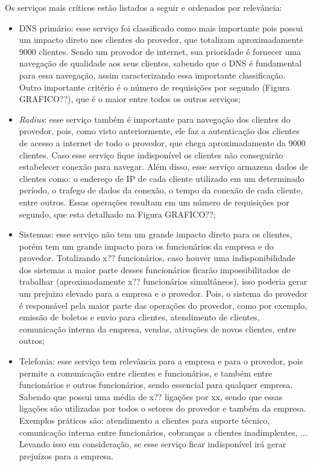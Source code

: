 Os serviços mais críticos estão listados a seguir e ordenados por relevância:
\begin{itemize}
 \item \ac{DNS} primário: esse serviço foi classificado como mais importante pois possui um impacto direto nos clientes do provedor, que 
 totalizam aproximadamente 9000 clientes. Sendo um provedor de internet, sua prioridade é fornecer uma navegação de qualidade aos seus clientes, 
 sabendo que o \ac{DNS} é fundamental para essa navegação, assim caracterizando essa importante classificação. Outro importante critério é
 o número de requisições por segundo (Figura GRAFICO??), que é o maior entre todos os outros serviços;
 
 \item \textit{Radius}: esse serviço também é importante para navegação dos clientes do provedor, pois, como visto anteriormente, ele faz a
 autenticação dos clientes de acesso a internet de todo o provedor, que chega aproximadamente da 9000 clientes. Caso esse serviço fique 
 indisponível os clientes não conseguirão estabelecer conexão para navegar. Além disso, esse serviço armazena dados de clientes como: o 
 endereço de \ac{IP} de cada cliente utilizado em um determinado período, o trafego de dados da conexão, o tempo da conexão de cada cliente, 
 entre outros. Essas operações resultam em um número de requisições por segundo, que esta detalhado na Figura GRAFICO??;
 
 \item Sistemas: esse serviço não tem um grande impacto direto para os clientes, porém tem um grande impacto para os funcionários da empresa e 
 do provedor. Totalizando x?? funcionários, caso houver uma indisponibilidade dos sistemas a maior parte desses funcionários ficarão 
 impossibilitados de trabalhar (aproximadamente x?? funcionários simultâneos), isso poderia gerar um prejuizo elevado para a empresa e o 
 provedor. Pois, o sistema do provedor é responsável pela maior parte das operações do provedor, como por exemplo, emissão de boletos e envio 
 para clientes, atendimento de clientes, comunicação interna da empresa, vendas, ativações de novos clientes, entre outros;
 
 \item Telefonia: esse serviço tem relevância para a empresa e para o provedor, pois permite a comunicação entre clientes e funcionários, 
 e também entre funcionários e outros funcionários, sendo essencial para qualquer empresa. Sabendo que possui uma média de x?? ligações por xx,
 sendo que essas ligações são utilizadas por todos o setores do provedor e também da empresa. Exemplos práticos são: atendimento a clientes para
 suporte técnico, comunicação interna entre funcionários, cobranças a clientes inadimplentes, ... Levando isso em consideração, se esse serviço
 ficar indisponível irá gerar prejuízos para a empresa.
\end{itemize}


